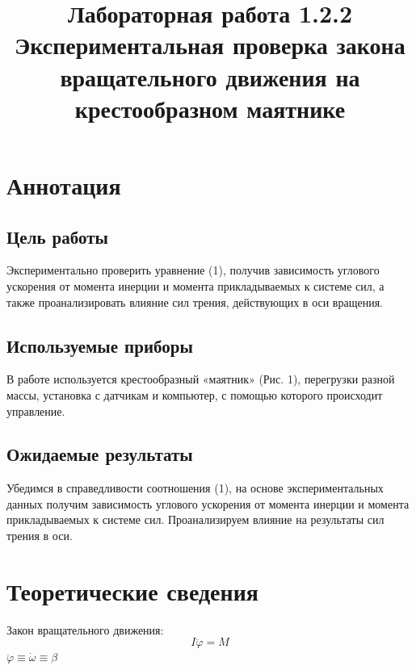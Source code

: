 \documentclass[a4paper,12pt]{article} %
\title{Лабораторная работа 1.2.2 Экспериментальная проверка закона вращательного движения на крестообразном маятнике}
\date{}
\begin{document}
\maketitle

\section{Аннотация}
\subsection{Цель работы}
Экспериментально проверить уравнение (1), получив зависимость углового ускорения от момента инерции и момента
прикладываемых к системе сил, а также проанализировать влияние
сил трения, действующих в оси вращения.

\subsection{Используемые приборы}
В работе используется крестообразный «маятник» (Рис. 1), перегрузки разной массы, установка с датчикам и компьютер, с помощью которого происходит управление.

\subsection{Ожидаемые результаты}
Убедимся в справедливости соотношения (1), на основе экспериментальных данных получим зависимость углового ускорения от момента инерции и момента прикладываемых к системе сил. Проанализируем влияние на результаты сил трения в оси.

\section{Теоретические сведения}
Закон вращательного движения:
\begin{equation}
I\ddot{\varphi} = M
\end{equation}
$\ddot{\varphi} \equiv \dot{\omega} \equiv \beta$
\end{document}
